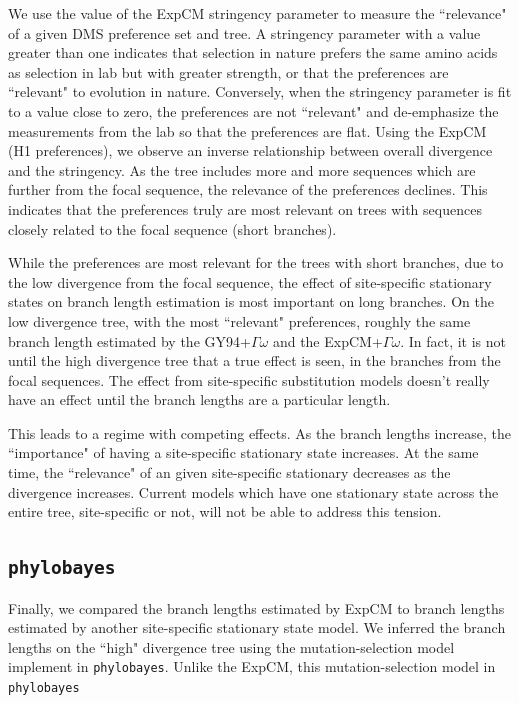 \documentclass[11pt]{article}
\begin{document}
We use the value of the ExpCM stringency parameter to measure the ``relevance" of a given DMS preference set and tree. 
A stringency parameter with a value greater than one indicates that selection in nature prefers the same amino acids as selection in lab but with greater strength, or that the preferences are ``relevant" to evolution in nature. 
Conversely, when the stringency parameter is fit to a value close to zero, the preferences are not ``relevant" and de-emphasize the measurements from the lab so that the preferences are flat. 
Using the ExpCM (H1 preferences), we observe an inverse relationship between overall divergence and the stringency. 
As the tree includes more and more sequences which are further from the focal sequence, the relevance of the preferences declines. 
This indicates that the preferences truly are most relevant on trees with sequences closely related to the focal sequence (short branches). 

While the preferences are most relevant for the trees with short branches, due to the low divergence from the focal sequence, the effect of site-specific stationary states on branch length estimation is most important on long branches. 
On the low divergence tree, with the most ``relevant" preferences, roughly the same branch length estimated by the GY94+$\Gamma\omega$  and the ExpCM+$\Gamma\omega$. 
In fact, it is not until the high divergence tree that a true effect is seen, in the branches from the focal sequences. 
The effect from site-specific substitution models doesn't really have an effect until the branch lengths are a particular length. 

This leads to a regime with competing effects. 
As the branch lengths increase, the ``importance" of having a site-specific stationary state increases. 
At the same time, the ``relevance" of an given site-specific stationary decreases as the divergence increases. 
Current models which have one stationary state across the entire tree, site-specific or not, will not be able to address this tension. 

\subsection*{\texttt{phylobayes}}

Finally, we compared the branch lengths estimated by ExpCM to branch lengths estimated by another site-specific stationary state model. 
We inferred the branch lengths on the ``high" divergence tree using the mutation-selection model implement in \texttt{phylobayes}. 
Unlike the ExpCM, this mutation-selection model in \texttt{phylobayes} 
\end{document}
